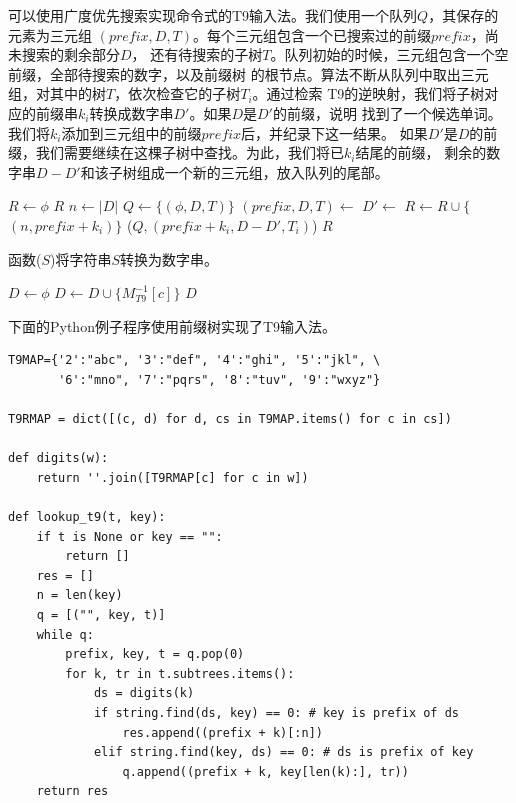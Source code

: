 \documentclass[b5paper]{ctexart}
\begin{document}
可以使用广度优先搜索实现命令式的T9输入法。我们使用一个队列$Q$，其保存的元素为三元组
$(prefix, D, T)$。每个三元组包含一个已搜索过的前缀$prefix$，尚未搜索的剩余部分$D$，
还有待搜索的子树$T$。队列初始的时候，三元组包含一个空前缀，全部待搜索的数字，以及前缀树
的根节点。算法不断从队列中取出三元组，对其中的树$T$，依次检查它的子树$T_i$。通过检索
T9的逆映射，我们将子树对应的前缀串$k_i$转换成数字串$D'$。如果$D$是$D'$的前缀，说明
找到了一个候选单词。我们将$k_i$添加到三元组中的前缀$prefix$后，并纪录下这一结果。
如果$D'$是$D$的前缀，我们需要继续在这棵子树中查找。为此，我们将已$k_i$结尾的前缀，
剩余的数字串$D-D'$和该子树组成一个新的三元组，放入队列的尾部。

\begin{algorithmic}[1]
  \State $R \gets \phi$
    \State \Return $R$
  \EndIf
  \State $n \gets |D|$
  \State $Q \gets \{(\phi, D, T)\}$
    \State $(prefix, D, T) \gets$ 
      \State $D' \gets$ 
       
        \State $R \gets R \cup \{$  $(n, prefix + k_i) \}$ 
        \State {}($Q, (prefix + k_i, D - D', T_i)$)
      \EndIf
    \EndFor
  \EndWhile
  \State \Return $R$
\EndFunction
\end{algorithmic}

函数($S$)将字符串$S$转换为数字串。

\begin{algorithmic}[1]
  \State $D \gets \phi$
    \State $D \gets D \cup \{M^{-1}_{T9}[c]\}$
  \EndFor
  \State \Return $D$
\EndFunction
\end{algorithmic}

下面的Python例子程序使用前缀树实现了T9输入法。

\lstset{language=Python}
\begin{lstlisting}
T9MAP={'2':"abc", '3':"def", '4':"ghi", '5':"jkl", \
       '6':"mno", '7':"pqrs", '8':"tuv", '9':"wxyz"}

T9RMAP = dict([(c, d) for d, cs in T9MAP.items() for c in cs])

def digits(w):
    return ''.join([T9RMAP[c] for c in w])

def lookup_t9(t, key):
    if t is None or key == "":
        return []
    res = []
    n = len(key)
    q = [("", key, t)]
    while q:
        prefix, key, t = q.pop(0)
        for k, tr in t.subtrees.items():
            ds = digits(k)
            if string.find(ds, key) == 0: # key is prefix of ds
                res.append((prefix + k)[:n])
            elif string.find(key, ds) == 0: # ds is prefix of key
                q.append((prefix + k, key[len(k):], tr))
    return res
\end{lstlisting}
\end{document}
